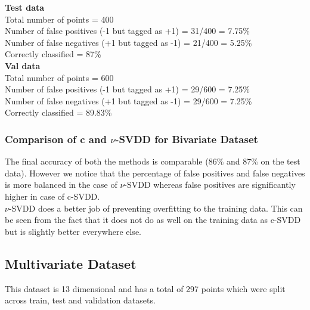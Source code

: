 \documentclass{article}
\begin{document}
\textbf{Test data\\}
Total number of points = 400 \\
Number of false positives (-1 but tagged as +1) = 31/400 = 7.75\%\\ 
Number of false negatives (+1 but tagged as -1) = 21/400 = 5.25\% \\  
Correctly classified = 87\%\\[10pt]
\textbf{Val data\\}
Total number of points = 600 \\
Number of false positives (-1 but tagged as +1) = 29/600 = 7.25\%\\ 
Number of false negatives (+1 but tagged as -1) = 29/600 = 7.25\% \\  
Correctly classified = 89.83\%\\[10pt]


\subsubsection{Comparison of c and $\nu$-SVDD for Bivariate Dataset}
The final accuracy of both the methods is comparable (86\% and 87\% on the test data). However we notice that the percentage of false positives and false negatives is more balanced in the case of $\nu$-SVDD whereas false positives are significantly higher in case of c-SVDD. \\[5pt]$\nu$-SVDD does a better job of preventing overfitting to the training data. This can be seen from the fact that it does not do as well on the training data as c-SVDD but is slightly better everywhere else.
\newpage
\subsection{Multivariate Dataset}
This dataset is 13 dimensional and has a total of 297 points which were split across train, test and validation datasets. 
\end{document}
